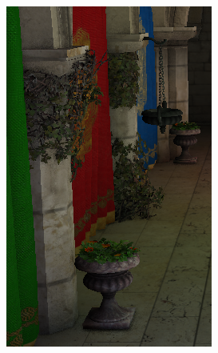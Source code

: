 \begin{figure}[htb]
\begin{subfigure}[b]{0.32\textwidth}
        \includegraphics[width=.95\textwidth]{screenshots/interleaved_with_textured}
        \caption{}
        \label{fig:results:interleaved_with_textured}
    \end{subfigure}
    \begin{subfigure}[b]{0.32\textwidth}
        \centering

\end{subfigure}
\end{figure}
